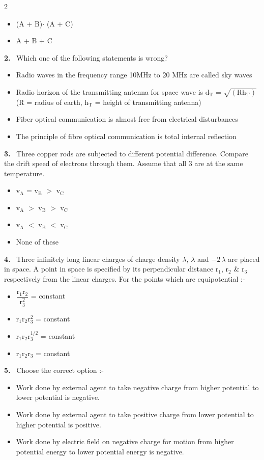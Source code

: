 \documentclass[10pt]{extarticle}
\newcommand{\qn}[1]{\par\smallskip\noindent\textbf{#1.}~}
\newenvironment{qoptions}{\begin{itemize}[leftmargin=1.8em,itemsep=1pt,topsep=2pt,label={}]}{\end{itemize}}
\newcommand{\opt}[2]{\item[(#1)] #2}
\begin{document}
\begin{multicols}{2}
\begin{qoptions}
\opt{C}{(A + B)$\cdot$ (A + C)}
\opt{D}{A + B + C}
\end{qoptions}
\qn{2} Which one of the following statements is wrong?
\begin{qoptions}
\opt{A}{Radio waves in the frequency range 10MHz to 20 MHz are called sky waves}
\opt{B}{Radio horizon of the transmitting antenna for space wave is d$_\text{T}$ = $\sqrt{(\text{Rh}_\text{T})}$ (R = radius of earth, h$_\text{T}$ = height of transmitting antenna)}
\opt{C}{Fiber optical communication is almost free from electrical disturbances}
\opt{D}{The principle of fibre optical communication is total internal reflection}
\end{qoptions}
\qn{3} Three copper rods are subjected to different potential difference. Compare the drift speed of electrons through them. Assume that all 3 are at the same temperature.\par
{}
\begin{qoptions}
\opt{A}{v$_\text{A}$ = v$_\text{B}$ $>$ v$_\text{C}$}
\opt{B}{v$_\text{A}$ $>$ v$_\text{B}$ $>$ v$_\text{C}$}
\opt{C}{v$_\text{A}$ $<$ v$_\text{B}$ $<$ v$_\text{C}$}
\opt{D}{None of these}
\end{qoptions}
\qn{4} Three infinitely long linear charges of charge density $\lambda$, $\lambda$ and $-2\,\lambda$ are placed in space. A point in space is specified by its perpendicular distance r$_1$, r$_2$ \& r$_3$ respectively from the linear charges. For the points which are equipotential :-
\begin{qoptions}
\opt{A}{$\dfrac{\text{r}_1\text{r}_2}{\text{r}_3^2}$ = constant}
\opt{B}{r$_1$r$_2$r$_3^2$ = constant}
\opt{C}{r$_1$r$_2$r$_3^{1/2}$ = constant}
\opt{D}{r$_1$r$_2$r$_3$ = constant}
\end{qoptions}
\qn{5} Choose the correct option :-
\begin{qoptions}
\opt{A}{Work done by external agent to take negative charge from higher potential to lower potential is negative.}
\opt{B}{Work done by external agent to take positive charge from lower potential to higher potential is positive.}
\opt{C}{Work done by electric field on negative charge for motion from higher potential energy to lower potential energy is negative.}

\end{qoptions}
\end{multicols}
\end{document}
